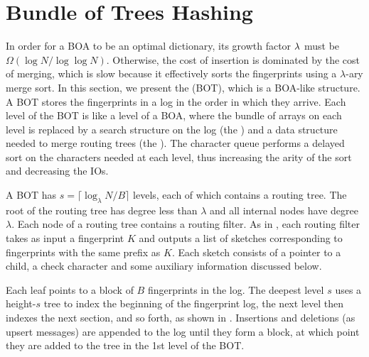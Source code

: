 \section{Bundle of Trees Hashing}\label{sec:boa-bot}

In order for a BOA to be an optimal dictionary, its growth factor $\lambda{}$
must be $\Omega(\log{N}/\log\log{N})$. Otherwise, the cost of insertion is
dominated by the cost of merging, which is slow because it effectively sorts
the fingerprints using a $\lambda$-ary merge sort. In this section, we present
the  (BOT), which is a BOA-like structure. A
BOT stores the fingerprints in a log in the order in which they arrive. Each
level of the BOT is like a level of a BOA, where the bundle of arrays on each
level is replaced by a search structure on the log (the )
and a data structure needed to merge routing trees (the ).  The character queue performs a delayed sort on the characters needed
at each level, thus increasing the arity of the sort and decreasing the IOs.

A BOT has $s = \lceil \log_\lambda N/B \rceil$ levels, each of which contains a
routing tree. The root of the routing tree has degree less than $\lambda$ and
all internal nodes have degree $\lambda$. Each node of a routing tree contains
a routing filter. As in , each routing filter takes as
input a fingerprint $K$ and outputs a list of sketches corresponding to
fingerprints with the same prefix as $K$. Each sketch consists of a pointer to
a child, a check character and some auxiliary information discussed below.

Each leaf points to a block of $B$ fingerprints in the log. The deepest level
$s$ uses a height-$s$ tree to index the beginning of the fingerprint log, the
next level then indexes the next section, and so forth, as shown in
. Insertions and deletions (as upsert messages) are
appended to the log until they form a block, at which point they are added to
the tree in the 1st level of the BOT.

